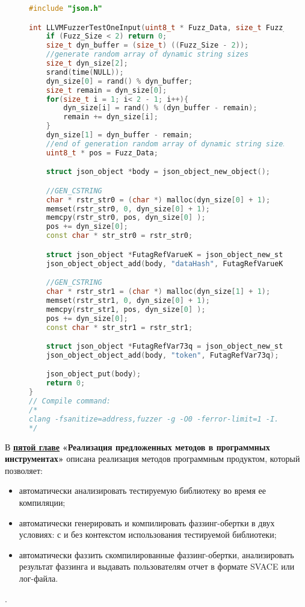 \begin{figure}[thp]
    \begin{lstlisting}[language=C++,frame=single,caption={Результат метода генерации фаззинг-обертки c контекстом использования},label=lst:wrapperWContext]
#include "json.h"

int LLVMFuzzerTestOneInput(uint8_t * Fuzz_Data, size_t Fuzz_Size){
    if (Fuzz_Size < 2) return 0;
    size_t dyn_buffer = (size_t) ((Fuzz_Size - 2));
    //generate random array of dynamic string sizes
    size_t dyn_size[2];
    srand(time(NULL));
    dyn_size[0] = rand() % dyn_buffer;
    size_t remain = dyn_size[0];
    for(size_t i = 1; i< 2 - 1; i++){
        dyn_size[i] = rand() % (dyn_buffer - remain);
        remain += dyn_size[i];
    }
    dyn_size[1] = dyn_buffer - remain;
    //end of generation random array of dynamic string sizes
    uint8_t * pos = Fuzz_Data;

    struct json_object *body = json_object_new_object();

    //GEN_CSTRING
    char * rstr_str0 = (char *) malloc(dyn_size[0] + 1);
    memset(rstr_str0, 0, dyn_size[0] + 1);
    memcpy(rstr_str0, pos, dyn_size[0] );
    pos += dyn_size[0];
    const char * str_str0 = rstr_str0;

    struct json_object *FutagRefVarueK = json_object_new_string(str_str1);
    json_object_object_add(body, "dataHash", FutagRefVarueK);

    //GEN_CSTRING
    char * rstr_str1 = (char *) malloc(dyn_size[1] + 1);
    memset(rstr_str1, 0, dyn_size[0] + 1);
    memcpy(rstr_str1, pos, dyn_size[0] );
    pos += dyn_size[0];
    const char * str_str1 = rstr_str1;

    struct json_object *FutagRefVar73q = json_object_new_string(str_str1);
    json_object_object_add(body, "token", FutagRefVar73q);

    json_object_put(body);
    return 0;
}
// Compile command:
/* 
clang -fsanitize=address,fuzzer -g -O0 -ferror-limit=1 -I. -I./.futag-build/  ./futag-drivers/context1.c -o ./futag-drivers/context1.out -Wl,--start-group ./libjson-c.a -Wl,--end-group
*/
\end{lstlisting}
\end{figure}

В \underline{\textbf{пятой главе}} {\textbf{«Реализация предложенных методов в программных инструментах»}} описана реализация методов программным продуктом, который позволяет:
\begin{itemize}
    \item автоматически анализировать тестируемую библиотеку во время ее компиляции;
    \item автоматически генерировать и компилировать фаззинг-обертки в двух условиях: с и без контекстом использования тестируемой библиотеки;
    \item автоматически фаззить скомпилированные фаззинг-обертки, анализировать результат фаззинга и выдавать пользователям отчет в формате SVACE или лог-файла.
\end{itemize}.

